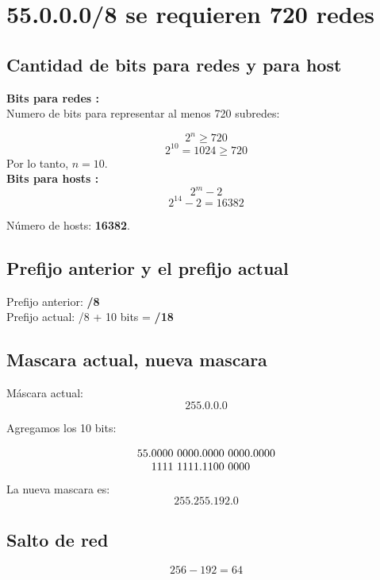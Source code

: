 \documentclass[letterpaper,12pt]{article}
\begin{document}
    

    \newpage
    \setcounter{page}{1}

    \section{55.0.0.0/8 se requieren 720 redes}

    \subsection{Cantidad de bits para redes y para host}
    \textbf{Bits para redes :} \\
    
    Numero de bits   para representar al menos 720 subredes:
    
    \[2^n \geq 720\]
    \[2^{10} = 1024 \geq 720\]
    Por lo tanto, $n = 10$. \\

    \textbf{Bits para hosts :} \\

    \[ 2^m - 2  \]
    \[ 2^{14} - 2 = 16382 \]

    Número de hosts: \textbf{16382}.

    \subsection{Prefijo anterior y el prefijo actual}
    Prefijo anterior: \textbf{/8} \\
    Prefijo actual: /8 + 10 bits   = \textbf{/18}

    \subsection{Mascara actual, nueva mascara}
    Máscara actual:
    \[ 255.0.0.0 \]

    Agregamos los 10 bits:

    \[
    55.\begin{array}[t]{@{}c@{}}
    0000 \ 0000 .0000 \ 0000  \\
    1111 \ 1111 .1100 \ 0000
    \end{array}.0000
    \]
    La nueva mascara es:
    \[ 255.255.192.0 \]

    \subsection{Salto de red}

    \[ 256 - 192 = 64 \]
\end{document}
